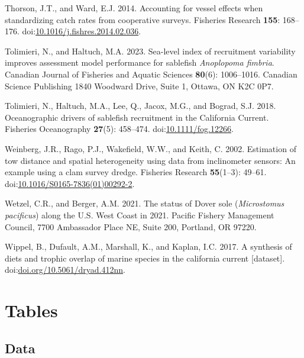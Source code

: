 \documentclass[
  english,
]{article}
\newlength{\cslhangindent}
\newenvironment{CSLReferences}[2] %
 {\begin{list}{}{%
  \setlength{\itemindent}{0pt}
  \setlength{\leftmargin}{0pt}
  \setlength{\parsep}{0pt}
  \ifodd #1
   \setlength{\leftmargin}{\cslhangindent}
   \setlength{\itemindent}{-1\cslhangindent}
  \fi
  \setlength{\itemsep}{#2\baselineskip}}}
 {\end{list}}
\begin{document}
\begin{CSLReferences}{1}{0}
Thorson, J.T., and Ward, E.J. 2014. Accounting for vessel effects when
standardizing catch rates from cooperative surveys. Fisheries Research
\textbf{155}: 168--176.
doi:\href{https://doi.org/10.1016/j.fishres.2014.02.036}{10.1016/j.fishres.2014.02.036}.

Tolimieri, N., and Haltuch, M.A. 2023. {Sea-level index of recruitment
variability improves assessment model performance for sablefish
\emph{Anoplopoma fimbria}}. Canadian Journal of Fisheries and Aquatic
Sciences \textbf{80}(6): 1006--1016. Canadian Science Publishing 1840
Woodward Drive, Suite 1, Ottawa, ON K2C 0P7.

Tolimieri, N., Haltuch, M.A., Lee, Q., Jacox, M.G., and Bograd, S.J.
2018. Oceanographic drivers of sablefish recruitment in the {California}
{Current}. Fisheries Oceanography \textbf{27}(5): 458--474.
doi:\href{https://doi.org/10.1111/fog.12266}{10.1111/fog.12266}.

Weinberg, J.R., Rago, P.J., Wakefield, W.W., and Keith, C. 2002.
Estimation of tow distance and spatial heterogeneity using data from
inclinometer sensors: An example using a clam survey dredge. Fisheries
Research \textbf{55}(1--3): 49--61.
doi:\href{https://doi.org/10.1016/S0165-7836(01)00292-2}{10.1016/S0165-7836(01)00292-2}.

Wetzel, C.R., and Berger, A.M. 2021. The status of {Dover} sole
(\emph{{Microstomus} pacificus}) along the {U}.{S}. {West} {Coast} in
2021. Pacific Fishery Management Council, 7700 Ambassador Place NE,
Suite 200, Portland, OR 97220.

Wippel, B., Dufault, A.M., Marshall, K., and Kaplan, I.C. 2017. A
synthesis of diets and trophic overlap of marine species in the
california current {[}dataset{]}.
doi:\href{https://doi.org/doi.org/10.5061/dryad.412nn}{doi.org/10.5061/dryad.412nn}.

\end{CSLReferences}

\newpage{}

\section{Tables}\label{tables}

\subsection{Data}\label{data-1}
\end{document}
